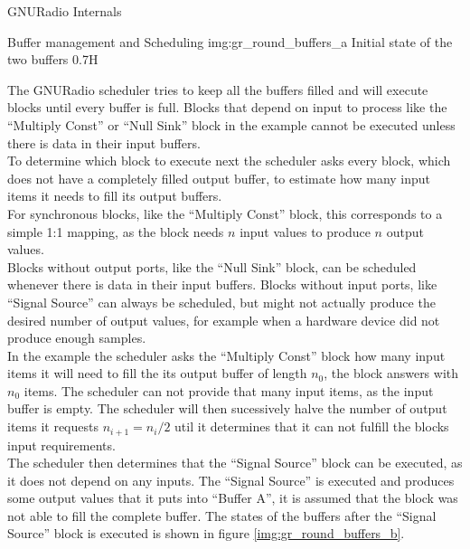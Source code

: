 \begin{subchapter}{GNURadio Internals}
\begin{subsubchapter}{Buffer management and Scheduling}
                 {img:gr_round_buffers_a}
                 {Initial state of the two buffers}
                 {0.7}{H}

    The GNURadio scheduler tries to keep all the buffers filled
    and will execute blocks until every buffer is full.
    Blocks that depend on input to process like the ``Multiply Const''
    or ``Null Sink'' block in the example cannot be executed
    unless there is data in their input buffers. \\

    To determine which block to execute next the scheduler
    asks every block, which does not have a completely filled
    output buffer, to estimate how many input items it needs to fill
    its output buffers. \\

    For synchronous blocks, like the ``Multiply Const'' block,
    this corresponds to a simple 1:1 mapping, as the block
    needs $n$ input values to produce $n$ output values. \\

    Blocks without output ports, like the ``Null Sink'' block,
    can be scheduled whenever there is data in their input
    buffers.
    Blocks without input ports, like ``Signal Source'' can
    always be scheduled, but might not actually produce the
    desired number of output values, for example when a
    hardware device did not produce enough samples. \\

    In the example the scheduler asks the ``Multiply Const''
    block how many input items it will need to fill the
    its output buffer of length $n_0$, the block answers with
    $n_0$ items.
    The scheduler can not provide that many input items,
    as the input buffer is empty.
    The scheduler will then sucessively halve the number
    of output items it requests $n_{i+1}=n_i/2$ util
    it determines that it can not fulfill the blocks
    input requirements. \\

    The scheduler then determines that the ``Signal Source''
    block can be executed, as it does not depend on any
    inputs.
    The ``Signal Source'' is executed and produces some
    output values that it puts into ``Buffer A'', it is assumed
    that the block was not able to fill the complete buffer.
    The states of the buffers after the ``Signal Source''
    block is executed is shown in figure \ref{img:gr_round_buffers_b}. \\


\end{subsubchapter}
\end{subchapter}

